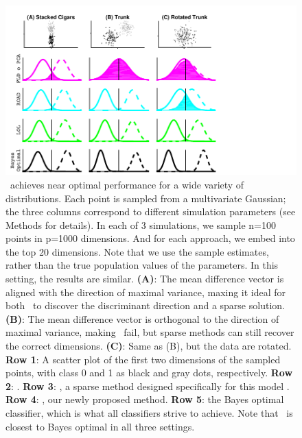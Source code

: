 \documentclass[10pt]{article}
\begin{document}
\begin{figure}%
\centering
\includegraphics[width=0.6\linewidth,trim=0in 0in 1.5in 0in,clip=true]{../Figs/cigars_est.pdf}%
\caption{
\Lol~achieves near optimal performance for a wide variety of distributions. 
Each point is sampled from a multivariate Gaussian; 
the three columns correspond to different simulation parameters (see Methods for details).  
In each of 3 simulations, we sample n=100 points in p=1000 dimensions.  And for each approach, we embed into the top 20 dimensions. Note that we use the sample estimates, rather than the true population values of the parameters.  In this setting, the results are  similar.
\textbf{(A)}: The mean difference vector is aligned with the direction of maximal variance, maxing it ideal for both \Pca~to discover the discriminant direction and a sparse solution.  
\textbf{(B)}: The mean difference vector is orthogonal to the direction of maximal variance, making \Pca~fail, but sparse methods can still recover the correct dimensions.
\textbf{(C)}: Same as (B), but the data are rotated.  
\textbf{Row 1}: A scatter plot of the first two dimensions of the sampled points, with class 0 and 1 as black and gray dots, respectively.  
\textbf{Row 2}: .
\textbf{Row 3}: , a sparse method designed specifically for this model \cite{Fan2012}.
\textbf{Row 4}: \Lol, our newly proposed method.
\textbf{Row 5}: the Bayes optimal classifier, which is what all classifiers strive to achieve.
Note that \Lol~is closest to Bayes optimal in all three settings.
}
\label{fig:cigars}
\end{figure}
\end{document}
